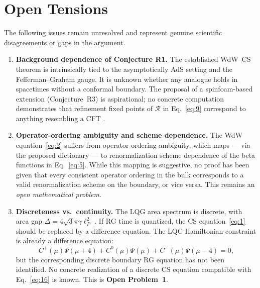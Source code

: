 \documentclass[11pt,a4paper]{article}
\begin{document}
\section{Open Tensions}

The following issues remain unresolved and represent genuine scientific disagreements or gaps in the argument.

\begin{enumerate}

  \item \textbf{Background dependence of Conjecture R1.} \label{ten:bgdep}
  The established WdW--CS theorem is intrinsically tied to the asymptotically AdS setting and the Fefferman--Graham gauge. It is unknown whether any analogue holds in spacetimes without a conformal boundary. The proposal of a spinfoam-based extension (Conjecture~R3) is aspirational; no concrete computation demonstrates that refinement fixed points of $\mathcal{R}$ in Eq.~\eqref{eq:9} correspond to anything resembling a CFT \cite{ashtekar2004,henson2006}.

  \item \textbf{Operator-ordering ambiguity and scheme dependence.} \label{ten:ordering}
  The WdW equation~\eqref{eq:2} suffers from operator-ordering ambiguity, which maps — via the proposed dictionary — to renormalization scheme dependence of the beta functions in Eq.~\eqref{eq:5}. While this mapping is suggestive, no proof has been given that every consistent operator ordering in the bulk corresponds to a valid renormalization scheme on the boundary, or vice versa. This remains an \emph{open mathematical problem}.

  \item \textbf{Discreteness vs.\ continuity.} \label{ten:discrete}
  The LQG area spectrum is discrete, with area gap $\Delta = 4\sqrt{3}\pi\gamma\ell_P^2$ \cite{ashtekar2004,thiemann1996}. If RG time is quantized, the CS equation~\eqref{eq:1} should be replaced by a difference equation. The LQC Hamiltonian constraint is already a difference equation:
  \begin{equation}
    C^+(\mu)\Psi(\mu+4) + C^0(\mu)\Psi(\mu) + C^-(\mu)\Psi(\mu-4) = 0,
    \label{eq:16}
  \end{equation}
  but the corresponding discrete boundary RG equation has not been identified. No concrete realization of a discrete CS equation compatible with Eq.~\eqref{eq:16} is known. This is \textbf{Open Problem~1}.


\end{enumerate}
\end{document}
